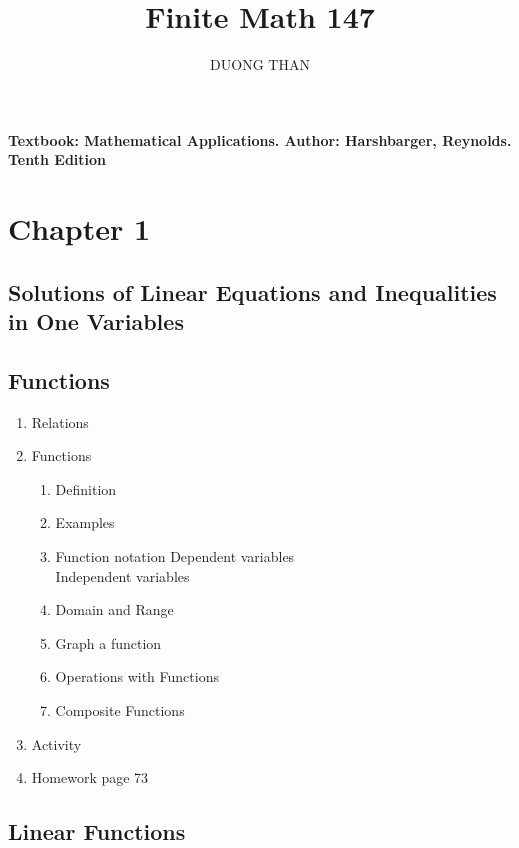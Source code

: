\documentclass[12pt]{amsart}
\author{DUONG THAN}
\title{Finite Math 147 }
\begin{document}
\maketitle
\large

\textbf{Textbook: Mathematical Applications. Author: Harshbarger, Reynolds. Tenth Edition}

\section{Chapter 1}
\subsection{Solutions of Linear Equations and Inequalities in One Variables}

\subsection{Functions}

\begin{enumerate}

	\item Relations 
	
	\item Functions
		\begin{enumerate}
			\item Definition
			
			\item Examples 
			
			\item Function notation
				Dependent variables \\
				Independent variables \\
			\item Domain and Range 
			
			\item Graph a function \\
			
			\item Operations with Functions
			
			\item Composite Functions 
			
		
		\end{enumerate}
	\item Activity 
	
	\item Homework page 73
	

\end{enumerate}
\subsection{Linear Functions}
\end{document}
